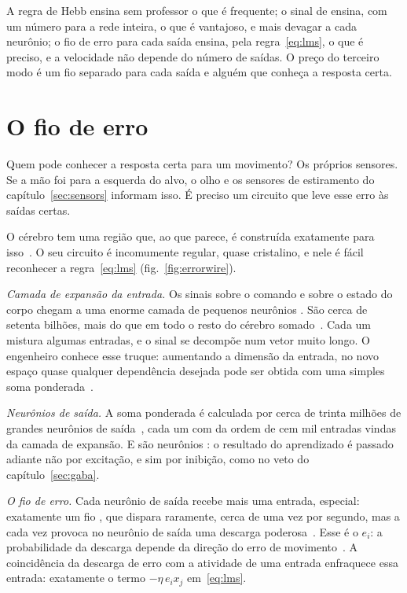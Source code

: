 \begin{keyblock}
\begin{proposition}
\label{prop:teachers}
A regra de Hebb ensina sem professor o que é frequente; o sinal de  ensina, com um número para a rede inteira, o que é vantajoso, e mais devagar a cada neurônio; o fio de erro para cada saída ensina, pela regra~\eqref{eq:lms}, o que é preciso, e a velocidade não depende do número de saídas. O preço do terceiro modo é um fio separado para cada saída e alguém que conheça a resposta certa.
\end{proposition}
\end{keyblock}

\section{O fio de erro}

Quem pode conhecer a resposta certa para um movimento? Os próprios sensores. Se a mão foi para a esquerda do alvo, o olho e os sensores de estiramento do capítulo~\ref{sec:sensors} informam isso. É preciso um circuito que leve esse erro às saídas certas.

O cérebro tem uma região que, ao que parece, é construída exatamente para isso~\cite{Marr1969,Albus1971}. O seu circuito é incomumente regular, quase cristalino, e nele é fácil reconhecer a regra~\eqref{eq:lms} (fig.~\ref{fig:errorwire}).

\emph{Camada de expansão da entrada.} Os sinais sobre o comando e sobre o estado do corpo chegam a uma enorme camada de pequenos neurônios . São cerca de setenta bilhões, mais do que em todo o resto do cérebro somado~\cite{Azevedo2009}. Cada um mistura algumas entradas, e o sinal se decompõe num vetor muito longo. O engenheiro conhece esse truque: aumentando a dimensão da entrada, no novo espaço quase qualquer dependência desejada pode ser obtida com uma simples soma ponderada~\cite{Cover1965}.

\emph{Neurônios de saída.} A soma ponderada é calculada por cerca de trinta milhões de grandes neurônios de saída~\cite{Andersen1992cereb}, cada um com da ordem de cem mil entradas vindas da camada de expansão. E são neurônios : o resultado do aprendizado é passado adiante não por excitação, e sim por inibição, como no veto do capítulo~\ref{sec:gaba}.

\emph{O fio de erro.} Cada neurônio de saída recebe mais uma entrada, especial: exatamente um fio , que dispara raramente, cerca de uma vez por segundo, mas a cada vez provoca no neurônio de saída uma descarga poderosa~\cite{Ito2001}. Esse é o $e_i$: a probabilidade da descarga depende da direção do erro de movimento~\cite{Herzfeld2018}. A coincidência da descarga de erro com a atividade de uma entrada enfraquece essa entrada: exatamente o termo $-\eta\,e_i x_j$ em~\eqref{eq:lms}.

